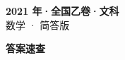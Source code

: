 \documentclass[zihao=-4, a4paper]{ctexart}
\begin{document}
\begin{center}
  {\Large\bfseries 2021 年·全国乙卷·文科}\\[4pt]
  {\large 数学 · 简答版}
\end{center}
\medskip
{}

\clearpage
{}
\begin{center}{\Large\bfseries 答案速查}\end{center}
\medskip

\end{document}
